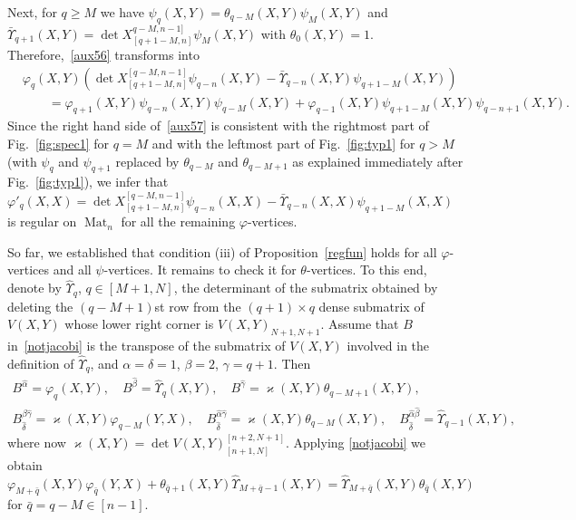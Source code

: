 \documentclass{amsart}
\theoremstyle{definition}
\theoremstyle{remark}
\numberwithin{equation}{section}
\numberwithin{theorem}{section}
\begin{document}
Next, for $q\geq M$ we have ${{\psi}}_q(X,Y)={{\theta}}_{q-M}(X,Y){{\psi}}_M(X,Y)$ and $\bar\Upsilon_{q+1}(X,Y)=
\det X_{[q+1-M,n]}^{q-M,n-1]}{{\psi}}_M(X,Y)$ with ${{\theta}}_0(X,Y)=1$.
Therefore,~\eqref{aux56} transforms into
\begin{equation}
\begin{aligned}
\label{aux57}
&{{\varphi}}_{q}(X,Y) \left (\det X^{[q-M,n-1]}_{[q+1-M,n]}{{\psi}}_{q-n}(X,Y) - \bar\Upsilon_{q-n}(X,Y){{\psi}}_{q+1-M}(X,Y)\right ) \\
& \qquad =  {{\varphi}}_{q+1}(X,Y) {{\psi}}_{q -n }(X,Y){{\psi}}_{q-M}(X,Y) + {{\varphi}}_{q-1}(X,Y) {{\psi}}_{q+1-M}(X,Y){{\psi}}_{q-n+1}(X,Y).
\end{aligned}
\end{equation}
Since the right hand side of~\eqref{aux57} is consistent with the rightmost part of Fig.~\ref{fig:spec1} for $q=M$
and with the leftmost part of Fig.~\ref{fig:typ1} for $q>M$ (with ${{\psi}}_q$ and ${{\psi}}_{q+1}$ replaced by
${{\theta}}_{q-M}$ and ${{\theta}}_{q-M+1}$ as explained immediately after Fig.~\ref{fig:typ1}), we infer that 
${{\varphi}}'_{q}(X,X) =\det X^{[q-M,n-1]}_{[q+1-M,n]}{{\psi}}_{q-n}(X,X) - \bar\Upsilon_{q-n}(X,X){{\psi}}_{q+1-M}(X,X)$
is regular on ${\operatorname{Mat}}_n$ for all the remaining ${{\varphi}}$-vertices. 

So far, we established that condition (iii) of Proposition~\ref{regfun} holds for all ${{\varphi}}$-vertices and
all ${{\psi}}$-vertices. It remains to check it for ${{\theta}}$-vertices.
To this end, denote by
$\hat \Upsilon_q$, $q\in [M+1,N]$,  the determinant of the submatrix obtained by deleting the $(q - M+1)$st 
row from the $(q+1)\times q$ dense submatrix 
 of $V(X,Y)$ whose lower right corner is $V(X,Y)_{N+1,N+1}$. 
  Assume that $B$ in~\eqref{notjacobi} is the transpose of the submatrix of $V(X,Y)$ involved in the definition 
of $\hat\Upsilon_q$,
and $\alpha=\delta=1$, $\beta=2$, $\gamma=q+1$.
Then
\begin{gather*}
B^{\hat\alpha}={{\varphi}}_q(X,Y), \quad B^{\hat\beta}=\hat\Upsilon_q(X,Y), \quad 
B^{\hat\gamma}=\varkappa(X,Y){{\theta}}_{q-M+1}(X,Y),\\
B^{\hat\beta\hat\gamma}_{\hat\delta}=\varkappa(X,Y){{\varphi}}_{q-M}(Y,X),\quad
B^{\hat\alpha\hat\gamma}_{\hat\delta}=\varkappa(X,Y){{\theta}}_{q-M}(X,Y),\quad
B^{\hat\alpha\hat\beta}_{\hat\delta}=\hat\Upsilon_{q-1}(X,Y),
\end{gather*}
 where now $\varkappa(X,Y) = \det  V(X,Y)_{[n+1,N]}^{[n+2,N+1]}$.
Applying \eqref{notjacobi}  we obtain
 \begin{equation}
\label{aux58}
{{\varphi}}_{M+\bar q}(X,Y){{\varphi}}_{\bar q}(Y,X) + {{\theta}}_{\bar q+1}(X,Y)\hat\Upsilon_{M+\bar q-1}(X,Y) 
 = \hat\Upsilon_{M+\bar q}(X,Y) {{\theta}}_{\bar q}(X,Y)
\end{equation}
 for $\bar q=q-M\in [n-1]$.
 
\end{document}
